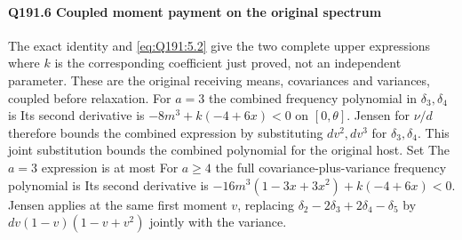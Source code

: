 \paragraph{Q191.6 Coupled moment payment on the original spectrum}\label{part:Q191.6}
The exact identity
and \eqref{eq:Q191:5.2} give the two complete upper expressions
where $k$ is the corresponding coefficient just proved, not an independent
parameter. These are the original receiving means, covariances and
variances, coupled before relaxation.
For $a=\allowbreak 3$ the combined frequency polynomial in $\delta_3,\allowbreak \delta_4$ is
Its second derivative is $-8m^3+k(-4+6x)<\allowbreak 0$ on $[0,\allowbreak \theta]$.
Jensen for $\nu/d$ therefore bounds the combined expression by substituting
$d v^2,\allowbreak d v^3$ for $\delta_3,\allowbreak \delta_4$. This joint substitution bounds the combined polynomial for the original host. Set
The $a=\allowbreak 3$ expression is at most
For $a\ge\allowbreak 4$ the full covariance-plus-variance frequency polynomial is
Its second derivative is
$-16m^3(1-3x+3x^2)+k(-4+6x)<\allowbreak 0$. Jensen applies at the same first
moment $v$, replacing $\delta_2-2\delta_3+2\delta_4-\delta_5$ by
$dv(1-v)(1-v+v^2)$ jointly with the variance. 

